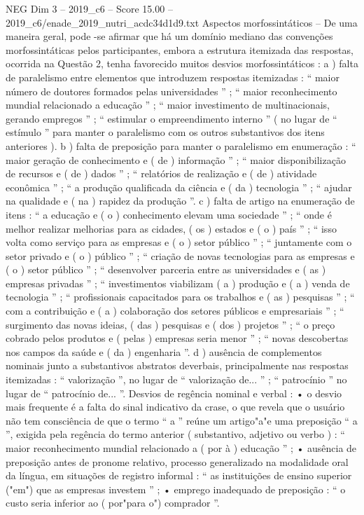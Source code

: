 \begin{textsample}{NEG Dim 3 – 2019\_c6 – Score 15.00 – 2019\_c6/enade\_2019\_nutri\_acdc34d1d9.txt}
Aspectos morfossintáticos – De uma maneira geral, pode -se afirmar que há um domínio mediano das convenções morfossintáticas pelos participantes, embora a estrutura itemizada das respostas, ocorrida na Questão 2, tenha favorecido muitos desvios morfossintáticos : a ) falta de paralelismo entre elementos que introduzem respostas itemizadas : “ maior número de doutores formados pelas universidades ” ; “ maior reconhecimento mundial relacionado a educação ” ; “ maior investimento de multinacionais, gerando empregos ” ; “ estimular o empreendimento interno ” ( no lugar de “ estímulo ” para manter o paralelismo com os outros substantivos dos itens anteriores ). b ) falta de preposição para manter o paralelismo em enumeração : “ maior geração de conhecimento e ( de ) informação ” ; “ maior disponibilização de recursos e ( de ) dados ” ; “ relatórios de realização e ( de ) atividade econômica ” ; “ a produção qualificada da ciência e ( da ) tecnologia ” ; “ ajudar na qualidade e ( na ) rapidez da produção ”. c ) falta de artigo na enumeração de itens : “ a educação e ( o ) conhecimento elevam uma sociedade ” ; “ onde é melhor realizar melhorias para as cidades, ( os ) estados e ( o ) país ” ; “ isso volta como serviço para as empresas e ( o ) setor público ” ; “ juntamente com o setor privado e ( o ) público ” ; “ criação de novas tecnologias para as empresas e ( o ) setor público ” ; “ desenvolver parceria entre as universidades e ( as ) empresas privadas ” ; “ investimentos viabilizam ( a ) produção e ( a ) venda de tecnologia ” ; “ profissionais capacitados para os trabalhos e ( as ) pesquisas ” ; “ com a contribuição e ( a ) colaboração dos setores públicos e empresariais ” ; “ surgimento das novas ideias, ( das ) pesquisas e ( dos ) projetos ” ; “ o preço cobrado pelos produtos e ( pelas ) empresas seria menor ” ; “ novas descobertas nos campos da saúde e ( da ) engenharia ”. d ) ausência de complementos nominais junto a substantivos abstratos deverbais, principalmente nas respostas itemizadas : “ valorização ”, no lugar de “ valorização de... ” ; “ patrocínio ” no lugar de “ patrocínio de... ”.
Desvios de regência nominal e verbal : • o desvio mais frequente é a falta do sinal indicativo da crase, o que revela que o usuário não tem consciência de que o termo “ a ” reúne um artigo"a"e uma preposição “ a ”, exigida pela regência do termo anterior ( substantivo, adjetivo ou verbo ) : “ maior reconhecimento mundial relacionado a ( por à ) educação ” ; • ausência de preposição antes de pronome relativo, processo generalizado na modalidade oral da língua, em situações de registro informal : “ as instituições de ensino superior ("em") que as empresas investem ” ; • emprego inadequado de preposição : “ o custo seria inferior ao ( por"para o") comprador ”.

\end{textsample}
